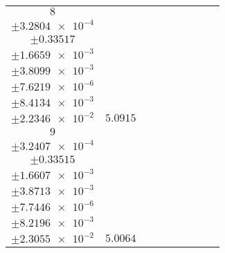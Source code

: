 \documentclass[8pt]{article}
\begin{document}
\begin{longtable}[l]{c c c c c c c c c}
$\num{8}$ & \begin{tabular}[c]{@{}c@{}}$\num{6.4412e-2}$ \\ $\pm\num{3.2804e-4}$\end{tabular} & \begin{tabular}[c]{@{}c@{}}$\num{-0.41957}$ \\ $\pm\num{0.33517}$\end{tabular} & \begin{tabular}[c]{@{}c@{}}$\num{-3.1517}$ \\ $\pm\num{1.6659e-3}$\end{tabular} & \begin{tabular}[c]{@{}c@{}}$\num{3.58e+3}$ \\ $\pm\num{3.8099e-3}$\end{tabular} & \begin{tabular}[c]{@{}c@{}}$\num{7.1619}$ \\ $\pm\num{7.6219e-6}$\end{tabular} & \begin{tabular}[c]{@{}c@{}}$\num{1.6509}$ \\ $\pm\num{8.4134e-3}$\end{tabular} & \begin{tabular}[c]{@{}c@{}}$\num{4.4441}$ \\ $\pm\num{2.2346e-2}$\end{tabular} & $\num{5.0915}$\\
$\num{9}$ & \begin{tabular}[c]{@{}c@{}}$\num{6.3166e-2}$ \\ $\pm\num{3.2407e-4}$\end{tabular} & \begin{tabular}[c]{@{}c@{}}$\num{0.39824}$ \\ $\pm\num{0.33515}$\end{tabular} & \begin{tabular}[c]{@{}c@{}}$\num{3.1513}$ \\ $\pm\num{1.6607e-3}$\end{tabular} & \begin{tabular}[c]{@{}c@{}}$\num{3.5863e+3}$ \\ $\pm\num{3.8713e-3}$\end{tabular} & \begin{tabular}[c]{@{}c@{}}$\num{7.1745}$ \\ $\pm\num{7.7446e-6}$\end{tabular} & \begin{tabular}[c]{@{}c@{}}$\num{1.6101}$ \\ $\pm\num{8.2196e-3}$\end{tabular} & \begin{tabular}[c]{@{}c@{}}$\num{4.5058}$ \\ $\pm\num{2.3055e-2}$\end{tabular} & $\num{5.0064}$\\

\end{longtable}
\end{document}
